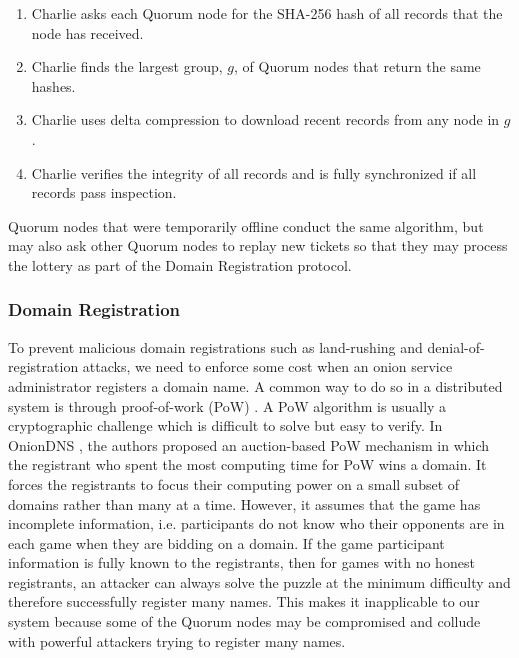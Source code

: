 \documentclass[USenglish,oneside,twocolumn]{article}
\begin{document}
\begin{enumerate}
	\item Charlie asks each Quorum node for the SHA-256 hash of all records that the node has received.
	\item Charlie finds the largest group, $ g $, of Quorum nodes that return the same hashes.
	\item Charlie uses delta compression to download recent records from any node in $ g $.
	\item Charlie verifies the integrity of all records and is fully synchronized if all records pass inspection.
\end{enumerate}

Quorum nodes that were temporarily offline conduct the same algorithm, but may also ask other Quorum nodes to replay new tickets so that they may process the lottery as part of the Domain Registration protocol. %



\subsubsection{Domain Registration}
\label{sec:ticketGeneration}

To prevent malicious domain registrations such as land-rushing and denial-of-registration attacks, we need to enforce some cost when an onion service administrator registers a domain name. A common way to do so in a distributed system is through proof-of-work (PoW) \cite{nakamoto2008bitcoin}. A PoW algorithm is usually a cryptographic challenge which is difficult to solve but easy to verify. In OnionDNS \cite{scaife2015oniondns}, the authors proposed an auction-based PoW mechanism in which the registrant who spent the most computing time for PoW wins a domain. It forces the registrants to focus their computing power on a small subset of domains rather than many at a time. However, it assumes that the game  has incomplete information, i.e. participants do not know who their opponents are in each game when they are bidding on a domain. If the game participant information is fully known to the registrants, then for games with no honest registrants, an attacker can always solve the puzzle at the minimum difficulty and therefore successfully register many names. This makes it inapplicable to our system because some of the Quorum nodes may be compromised and collude with powerful attackers trying to register many names. 
\end{document}
